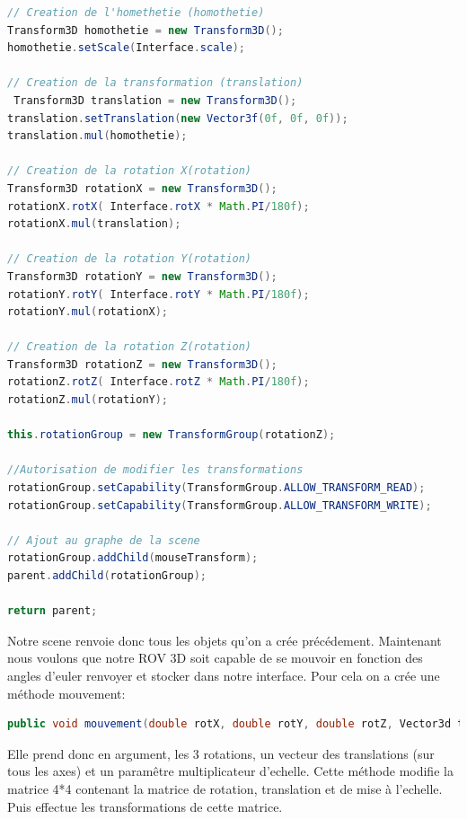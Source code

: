 \documentclass[a4paper,11pt]{report}
\begin{document}
		\begin{lstlisting}[language=java]
// Creation de l'homethetie (homothetie)
Transform3D homothetie = new Transform3D();
homothetie.setScale(Interface.scale); 
    
// Creation de la transformation (translation)
 Transform3D translation = new Transform3D();
translation.setTranslation(new Vector3f(0f, 0f, 0f));
translation.mul(homothetie);
    
// Creation de la rotation X(rotation)
Transform3D rotationX = new Transform3D();
rotationX.rotX( Interface.rotX * Math.PI/180f);
rotationX.mul(translation);
    
// Creation de la rotation Y(rotation)
Transform3D rotationY = new Transform3D();
rotationY.rotY( Interface.rotY * Math.PI/180f);
rotationY.mul(rotationX);
    
// Creation de la rotation Z(rotation)
Transform3D rotationZ = new Transform3D();
rotationZ.rotZ( Interface.rotZ * Math.PI/180f);
rotationZ.mul(rotationY);
    
this.rotationGroup = new TransformGroup(rotationZ);

//Autorisation de modifier les transformations
rotationGroup.setCapability(TransformGroup.ALLOW_TRANSFORM_READ);
rotationGroup.setCapability(TransformGroup.ALLOW_TRANSFORM_WRITE);
    
// Ajout au graphe de la scene
rotationGroup.addChild(mouseTransform);
parent.addChild(rotationGroup);

return parent;
		\end{lstlisting}
		Notre scene renvoie donc tous les objets qu'on a crée précédement.
		\newline \newline Maintenant nous voulons que notre ROV 3D soit capable de se mouvoir en fonction des angles d'euler renvoyer et stocker dans notre interface.
		\newline Pour cela on a crée une méthode mouvement:
		\begin{lstlisting}[language=java]
public void mouvement(double rotX, double rotY, double rotZ, Vector3d trans, double scale)
		\end{lstlisting}
		Elle prend donc en argument, les 3 rotations, un vecteur des translations (sur tous les axes) et un paramêtre multiplicateur d'echelle.
		\newline Cette méthode modifie la matrice 4*4 contenant la matrice de rotation, translation et de mise à l'echelle.
		\newline Puis effectue les transformations de cette matrice.
		
\end{document}
